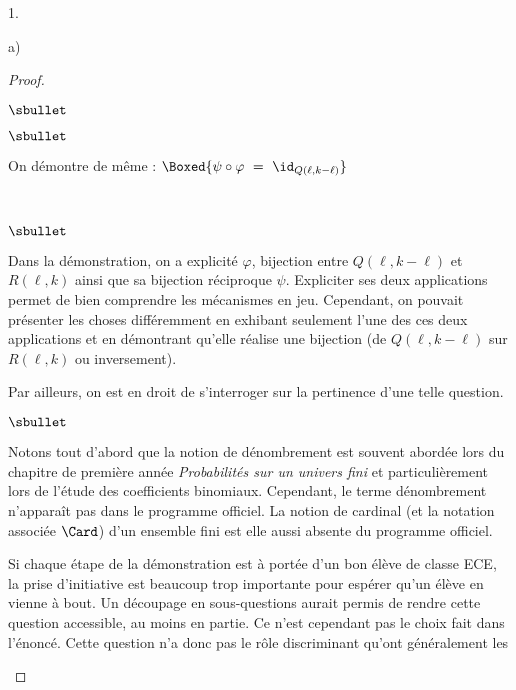 \documentclass[11pt]{article}%
\begin{document}
\begin{noliste}{1.}
\begin{noliste}{a)}
\begin{proof}
\begin{noliste}{$\sbullet$}
\begin{noliste}{$\sbullet$}
        \item On démontre de même : $\Boxed{\psi \circ \varphi \ = \
          \id_{Q(\ell, k-\ell)}}$\\[-.6cm]
        \end{noliste}        
      \end{noliste}  
      ~\\[-.8cm]
      \begin{remarkL}{.98}%
        \begin{noliste}{$\sbullet$}
        \item Dans la démonstration, on a explicité $\varphi$,
          bijection entre $Q(\ell, k - \ell)$ et $R(\ell, k)$ ainsi
          que sa bijection réciproque $\psi$. Expliciter ses deux
          applications permet de bien comprendre les mécanismes en
          jeu. Cependant, on pouvait présenter les choses différemment
          en exhibant seulement l'une des ces deux applications et en
          démontrant qu'elle réalise une bijection (de $Q(\ell, k -
          \ell)$ sur $R(\ell, k)$ ou inversement).
        \end{noliste}
        Par ailleurs, on est en droit de s'interroger sur la
        pertinence d'une telle question.
        \begin{noliste}{$\sbullet$}
        \item Notons tout d'abord que la notion de dénombrement est
          souvent abordée lors du chapitre de première année {\it
            Probabilités sur un univers fini} et particulièrement lors
          de l'étude des coefficients binomiaux. Cependant, le terme
          \og dénombrement \fg{} n'apparaît pas dans le programme
          officiel. La notion de cardinal (et la notation associée
          $\Card$) d'un ensemble fini est elle aussi absente du
          programme officiel.
        \item Si chaque étape de la démonstration est à portée d'un
          bon élève de classe ECE, la prise d'initiative est beaucoup
          trop importante pour espérer qu'un élève en vienne à
          bout. Un découpage en sous-questions aurait permis de rendre
          cette question accessible, au moins en partie. Ce n'est
          cependant pas le choix fait dans l'énoncé. Cette question
          n'a donc pas le rôle discriminant qu'ont généralement les

\end{noliste}
\end{remarkL}
\end{proof}
\end{noliste}
\end{noliste}
\end{document}
